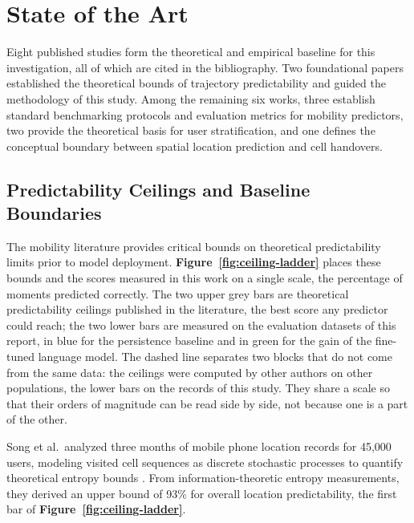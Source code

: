 \chapter{State of the Art}
\label{ch:sota}

Eight published studies form the theoretical and empirical baseline for this investigation, all of which are cited in the bibliography. Two foundational papers established the theoretical bounds of trajectory predictability and guided the methodology of this study. Among the remaining six works, three establish standard benchmarking protocols and evaluation metrics for mobility predictors, two provide the theoretical basis for user stratification, and one defines the conceptual boundary between spatial location prediction and cell handovers.

\section{Predictability Ceilings and Baseline Boundaries}
\label{sec:sota-ceiling}

The mobility literature provides critical bounds on theoretical predictability limits prior to model deployment. \textbf{Figure~\ref{fig:ceiling-ladder}} places these bounds and the scores measured in this work on a single scale, the percentage of moments predicted correctly. The two upper grey bars are theoretical predictability ceilings published in the literature, the best score any predictor could reach; the two lower bars are measured on the evaluation datasets of this report, in blue for the persistence baseline and in green for the gain of the fine-tuned language model. The dashed line separates two blocks that do not come from the same data: the ceilings were computed by other authors on other populations, the lower bars on the records of this study. They share a scale so that their orders of magnitude can be read side by side, not because one is a part of the other.



Song et al.\ analyzed three months of mobile phone location records for 45,000 users, modeling visited cell sequences as discrete stochastic processes to quantify theoretical entropy bounds \textbf{\cite{song2010limits}}. From information-theoretic entropy measurements, they derived an upper bound of 93\% for overall location predictability, the first bar of \textbf{Figure~\ref{fig:ceiling-ladder}}.

